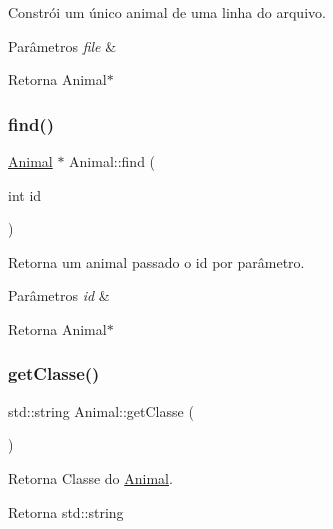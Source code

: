Constrói um único animal de uma linha do arquivo. 


\begin{DoxyParams}{Parâmetros}
{\em file} & \\
\hline
\end{DoxyParams}
\begin{DoxyReturn}{Retorna}
Animal$\ast$ 
\end{DoxyReturn}
\mbox{\label{classAnimal_aac52a938d9c55280467c9f6e9564df95}} 
\subsubsection{\texorpdfstring{find()}{find()}}
{\footnotesize\ttfamily \hyperlink{classAnimal}{Animal} $\ast$ Animal\+::find (\begin{DoxyParamCaption}\item[{int}]{id }\end{DoxyParamCaption})\hspace{0.3cm}{\ttfamily [static]}}



Retorna um animal passado o id por parâmetro. 


\begin{DoxyParams}{Parâmetros}
{\em id} & \\
\hline
\end{DoxyParams}
\begin{DoxyReturn}{Retorna}
Animal$\ast$ 
\end{DoxyReturn}
\mbox{\label{classAnimal_a22e54ff48117237f9a201f5eca0eea81}} 
\subsubsection{\texorpdfstring{get\+Classe()}{getClasse()}}
{\footnotesize\ttfamily std\+::string Animal\+::get\+Classe (\begin{DoxyParamCaption}{ }\end{DoxyParamCaption})}



Retorna Classe do \hyperlink{classAnimal}{Animal}. 

\begin{DoxyReturn}{Retorna}
std\+::string 
\end{DoxyReturn}
\mbox{\label{classAnimal_a6fcb9a0b8debecb58ca20dbf88bce329}} 
